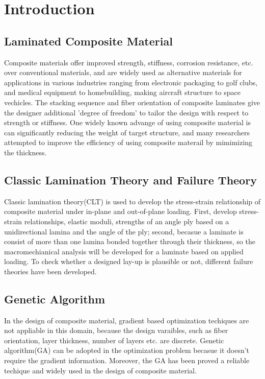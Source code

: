 
\chapter{Introduction} %

\label{Chapter1} %


\section{Laminated Composite Material}

Composite materials offer improved strength, stiffness, corrosion resistance,
etc. over conventional materials, and are widely used as alternative materials
for applications in various industries ranging from electronic packaging to golf
clubs, and medical equipment to homebuilding, making aircraft structure to space
vechicles. The stacking sequence and fiber orientation of composite laminates
give the designer additional 'degree of freedom' to tailor the design with
respect to strength or stiffness.  One widely known advange of using composite
material is can significantly reducing the weight of target structure, and many
researchers attempted to improve the efficiency of using composite materail by
mimimizing the thickness.

\section{Classic Lamination Theory and Failure Theory}
Classic lamination theory(CLT) is used to develop the stress-strain relationship of
composite material under in-plane and out-of-plane loading. First, develop
stress-strain relationships, elastic moduli, strengths of an angle ply based on
a unidirectional lamina and the angle of the ply; second, becasue a laminate is
consist of more than one lamina bonded together through their thickness, so the
macromechianical analysis will be developed for a laminate based on applied
loading.  To check whether a designed lay-up is plausible or not, different
failure theories have been developed.

\section{Genetic Algorithm}
In the design of composite material, gradient based optimization techiques are
not appliable in this domain, because the design varaibles, such as fiber
orientation, layer thickness, number of layers etc. are discrete. Genetic
algorithm(GA) can be adopted in the optimization problem becasue it doesn't require
the gradient information. Moreover, the GA has been proved a reliable techique
and widely used in the design of composite material. 

